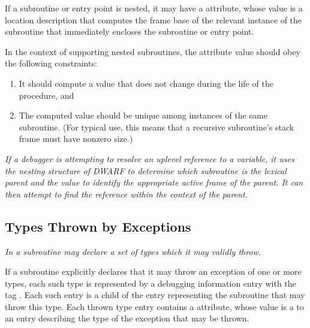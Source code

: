 If 
\hypertarget{chap:DWATstaticlinklocationofuplevelframe}{}
a 
subroutine or entry point is nested, it may have a
\DWATstaticlink{}
attribute, whose value is a location
description that computes the frame base of the relevant
instance of the subroutine that immediately encloses the
subroutine or entry point.

In the context of supporting nested subroutines, the
\DWATframebase{} attribute value should obey the following
constraints:

\begin{enumerate}[1. ]
\item It should compute a value that does not change during the
life of the procedure, and

\item The computed value should be unique among instances of
the same subroutine. (For typical \DWATframebase{} use, this
means that a recursive subroutine\textquoteright s stack frame must have
non\dash zero size.)
\end{enumerate}

\textit{If a debugger is attempting to resolve an up\dash level reference
to a variable, it uses the nesting structure of DWARF to
determine which subroutine is the lexical parent and the
\DWATstaticlink{} value to identify the appropriate active
frame of the parent. It can then attempt to find the reference
within the context of the parent.}


\subsection{Types Thrown by Exceptions}
\label{chap:typesthrownbyexceptions}

\textit{In  a subroutine may declare a set of types which
it may validly throw.}

If a subroutine explicitly declares that it may throw
an 
exception of one or more types, each such type is
represented by a debugging information entry with 
the tag
\DWTAGthrowntypeTARG.  
Each such entry is a child of the entry
representing the subroutine that may throw this type. Each
thrown type entry contains 
a \DWATtype{} attribute, whose
value is a  
to an entry describing the type of the
exception that may be thrown.


